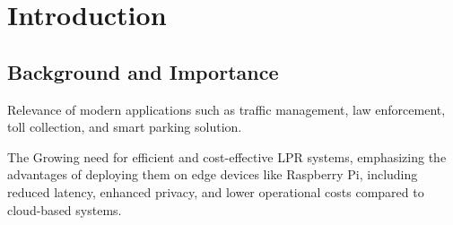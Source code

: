 \chapter{Introduction}
\label{chapter:intro}



\section{Background and Importance}
\label{sec:background-and-importance}

Relevance of modern applications such as traffic management, law enforcement, toll collection, and smart parking solution.

The Growing need for efficient and cost-effective LPR systems, emphasizing the advantages of deploying them on edge
devices like Raspberry Pi, including reduced latency, enhanced privacy, and lower operational costs compared to cloud-based systems.
